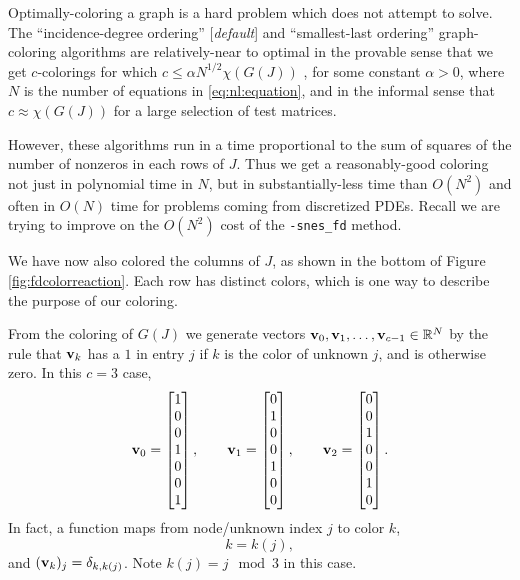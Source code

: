 Optimally-coloring a graph is a hard problem which \PETSc does not attempt to solve.  The \PETSc ``incidence-degree ordering'' [\emph{default}] and ``smallest-last ordering'' graph-coloring algorithms are relatively-near to optimal in the provable sense that we get $c$-colorings for which $c \le \alpha N^{1/2} \chi(G(J))$ \citep{ColemanMore1983}, for some constant $\alpha>0$, where $N$ is the number of equations in \eqref{eq:nl:equation}, and in the informal sense that $c\approx \chi(G(J))$ for a large selection of test matrices.

However, these algorithms run in a time proportional to the sum of squares of the number of nonzeros in each rows of $J$.  Thus we get a reasonably-good coloring not just in polynomial time in $N$, but in substantially-less time than $O(N^2)$ and often in $O(N)$ time for problems coming from discretized PDEs.  Recall we are trying to improve on the $O(N^2)$ cost of the \texttt{-snes\_fd} method.

We have now also colored the columns of $J$, as shown in the bottom of Figure \ref{fig:fdcolorreaction}.  Each row has distinct colors, which is one way to describe the purpose of our coloring.

From the coloring of $G(J)$ we generate vectors $\mathbf{v}_0, \mathbf{v}_1, \dots, \mathbf{v}_{c-1} \in \mathbb{R}^N$ by the rule that $\mathbf{v}_k$ has a $1$ in entry $j$ if $k$ is the color of unknown $j$, and is otherwise zero.  In this $c=3$ case,
\begin{equation}
\mathbf{v}_0 = \begin{bmatrix} 1 \\ 0 \\ 0 \\ 1 \\ 0 \\ 0 \\ 1 \end{bmatrix}, \qquad
\mathbf{v}_1 = \begin{bmatrix} 0 \\ 1 \\ 0 \\ 0 \\ 1 \\ 0 \\ 0 \end{bmatrix}, \qquad
\mathbf{v}_2 = \begin{bmatrix} 0 \\ 0 \\ 1 \\ 0 \\ 0 \\ 1 \\ 0 \end{bmatrix}.
 \label{eq:nl:coloringvecs}
\end{equation}
In fact, a function maps from node/unknown index $j$ to color $k$,
\begin{equation}
k = k(j),  \label{eq:nl:colorfunc}
\end{equation}
and $(\mathbf{v}_k)_j = \delta_{k,k(j)}$.  Note $k(j) = j\mod 3$ in this case.

